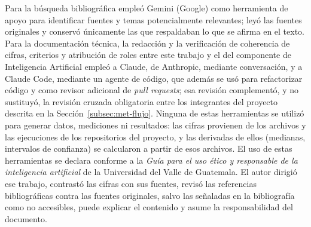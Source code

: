 Para la búsqueda bibliográfica empleó Gemini (Google) como herramienta de apoyo para identificar
fuentes y temas potencialmente relevantes; leyó las fuentes originales y conservó únicamente las que
respaldaban lo que se afirma en el texto. Para la documentación técnica, la redacción y la
verificación de coherencia de cifras, criterios y atribución de roles entre este trabajo y el del
componente de Inteligencia Artificial empleó a Claude, de Anthropic, mediante conversación, y a
Claude Code, mediante un agente de código, que además se usó para refactorizar código y como
revisor adicional de \textit{pull requests}; esa revisión complementó, y no sustituyó, la revisión
cruzada obligatoria entre los integrantes del proyecto descrita en la
Sección~\ref{subsec:met-flujo}. Ninguna de estas herramientas se utilizó para generar datos,
mediciones ni resultados: las cifras provienen de los archivos y las ejecuciones de los
repositorios del proyecto, y las derivadas de ellos (medianas, intervalos de confianza) se
calcularon a partir de esos archivos. El uso de estas herramientas se declara conforme a la \textit{Guía para el uso ético y responsable de la inteligencia artificial} de la Universidad del Valle de Guatemala. El autor dirigió ese trabajo, contrastó las cifras con sus
fuentes, revisó las referencias bibliográficas contra las fuentes originales, salvo las señaladas
en la bibliografía como no accesibles, puede explicar el contenido y asume la responsabilidad del
documento.

\ifdefined\modoensamble
\else
	
\fi
